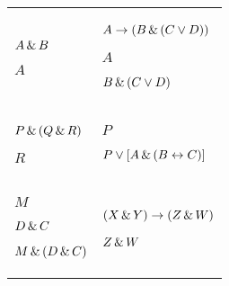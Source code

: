 \begin{exercises} \vspace{-.5cm}
\begin{longtabu}{X[1]X[1]} 

\item %
	\begin{earg*}
	\item  $A \,\&\, B$
 
	\itemc[.3]$A$ 	
	\end{earg*}
&

\item %
	\begin{earg*}
	\item $A \rightarrow (B \,\&\, (C \vee D))$
	\item $A$
 
	\itemc[.3]$B \,\&\, (C \vee D)$
	\end{earg*}
\\

\item %
	\begin{earg*}
	\item $P \,\&\, (Q \,\&\, R)$
 
	\itemc[.3]$R$
	\end{earg*}
&

\item %
	\begin{earg*}
	\item  $P$
 
	\itemc[.3] $P \vee [A \,\&\, (B \leftrightarrow C)]$
	\end{earg*}
\\

\item %
	\begin{earg*}
	\item  $M$
	\item  $D \,\&\, C$
 
	\itemc[.3] $M \,\&\, (D \,\&\, C)$
	\end{earg*}
&

\item %
	\begin{earg*}
	\item $(X \,\&\, Y) \rightarrow (Z \,\&\, W)$
	\item $Z \,\&\, W$
 

\end{earg*}
\end{longtabu}
\end{exercises}
